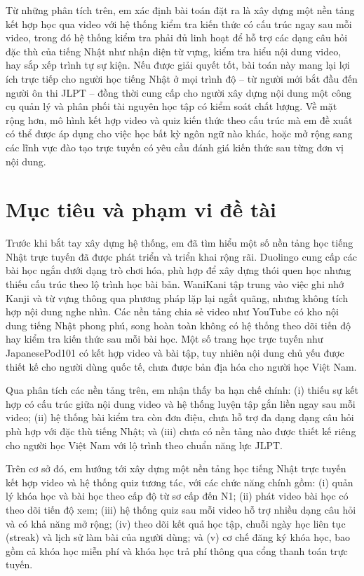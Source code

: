 \documentclass[../DoAn.tex]{subfiles}
\begin{document}
Từ những phân tích trên, em xác định bài toán đặt ra là xây dựng một nền tảng kết hợp học qua video với hệ thống kiểm tra kiến thức có cấu trúc ngay sau mỗi video, trong đó hệ thống kiểm tra phải đủ linh hoạt để hỗ trợ các dạng câu hỏi đặc thù của tiếng Nhật như nhận diện từ vựng, kiểm tra hiểu nội dung video, hay sắp xếp trình tự sự kiện. Nếu được giải quyết tốt, bài toán này mang lại lợi ích trực tiếp cho người học tiếng Nhật ở mọi trình độ -- từ người mới bắt đầu đến người ôn thi JLPT -- đồng thời cung cấp cho người xây dựng nội dung một công cụ quản lý và phân phối tài nguyên học tập có kiểm soát chất lượng. Về mặt rộng hơn, mô hình kết hợp video và quiz kiến thức theo cấu trúc mà em đề xuất có thể được áp dụng cho việc học bất kỳ ngôn ngữ nào khác, hoặc mở rộng sang các lĩnh vực đào tạo trực tuyến có yêu cầu đánh giá kiến thức sau từng đơn vị nội dung.

\section{Mục tiêu và phạm vi đề tài}
\label{section:1.2}

Trước khi bắt tay xây dựng hệ thống, em đã tìm hiểu một số nền tảng học tiếng Nhật trực tuyến đã được phát triển và triển khai rộng rãi. Duolingo cung cấp các bài học ngắn dưới dạng trò chơi hóa, phù hợp để xây dựng thói quen học nhưng thiếu cấu trúc theo lộ trình học bài bản. WaniKani tập trung vào việc ghi nhớ Kanji và từ vựng thông qua phương pháp lặp lại ngắt quãng, nhưng không tích hợp nội dung nghe nhìn. Các nền tảng chia sẻ video như YouTube có kho nội dung tiếng Nhật phong phú, song hoàn toàn không có hệ thống theo dõi tiến độ hay kiểm tra kiến thức sau mỗi bài học. Một số trang học trực tuyến như JapanesePod101 có kết hợp video và bài tập, tuy nhiên nội dung chủ yếu được thiết kế cho người dùng quốc tế, chưa được bản địa hóa cho người học Việt Nam.

Qua phân tích các nền tảng trên, em nhận thấy ba hạn chế chính: (i) thiếu sự kết hợp có cấu trúc giữa nội dung video và hệ thống luyện tập gắn liền ngay sau mỗi video; (ii) hệ thống bài kiểm tra còn đơn điệu, chưa hỗ trợ đa dạng dạng câu hỏi phù hợp với đặc thù tiếng Nhật; và (iii) chưa có nền tảng nào được thiết kế riêng cho người học Việt Nam với lộ trình theo chuẩn năng lực JLPT.

Trên cơ sở đó, em hướng tới xây dựng một nền tảng học tiếng Nhật trực tuyến kết hợp video và hệ thống quiz tương tác, với các chức năng chính gồm: (i) quản lý khóa học và bài học theo cấp độ từ sơ cấp đến N1; (ii) phát video bài học có theo dõi tiến độ xem; (iii) hệ thống quiz sau mỗi video hỗ trợ nhiều dạng câu hỏi và có khả năng mở rộng; (iv) theo dõi kết quả học tập, chuỗi ngày học liên tục (streak) và lịch sử làm bài của người dùng; và (v) cơ chế đăng ký khóa học, bao gồm cả khóa học miễn phí và khóa học trả phí thông qua cổng thanh toán trực tuyến.
\end{document}
